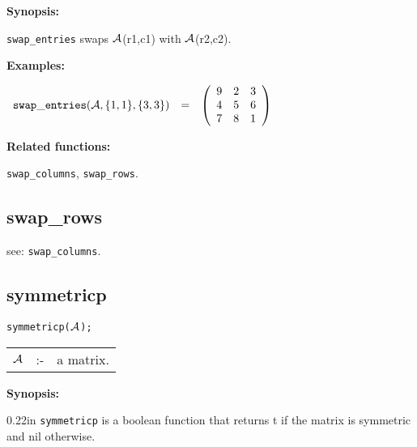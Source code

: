 {\bf Synopsis:} %

\hspace*{0.175in} {\tt swap\_entries} swaps ${\cal A}$(r1,c1) with 
                ${\cal A}$(r2,c2).

{\bf Examples:}

\begin{flushleft}  
\hspace*{0.1in}
\begin{math}  
\begin{array}{ccc}
{\tt swap\_entries}({\cal A},\{1,1\},\{3,3\}) & = & 
        \left( \begin{array}{ccc} 9 & 2 & 3 \\ 4 & 5 & 6 \\ 7 & 8 & 1
 \end{array} \right) 
\end{array}
\end{math}  
\end{flushleft}

{\bf Related functions:}

\hspace*{0.175in} {\tt swap\_columns}, {\tt swap\_rows}.


\subsection{swap\_rows}

\hspace*{0.175in} see: {\tt swap\_columns}.


\subsection{symmetricp}


\hspace*{0.175in} {\tt symmetricp(${\cal A}$);}

\hspace*{0.1in}  
\begin{tabular}{l l l} 
${\cal A}$ &:-& a matrix. 
\end{tabular}

{\bf Synopsis:} %

\begin{addtolength}{\leftskip}{0.22in}
{\tt symmetricp} is a boolean function that returns t if the 
                matrix is symmetric and nil otherwise.

\end{addtolength}

